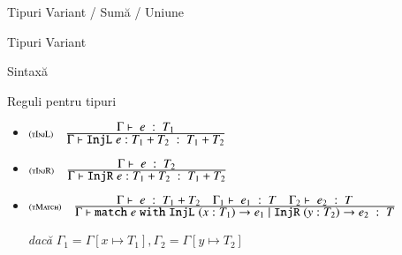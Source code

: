 \documentclass[xcolor=pdftex,romanian,colorlinks]{beamer}
\begin{document}
\begin{section}{Tipuri Variant / Sumă / Uniune}
\begin{frame}{Tipuri Variant}
\begin{block}{Sintaxă}
\end{block}

\begin{block}{Reguli pentru tipuri}
{\small\begin{itemize}
\item[] $\reg[tInjL]{\tjud{\terminal{InjL} e : T_1 + T_2}{T_1 + T_2}}{\tjud{e}{T_1}{}}{}$
\item[] $\reg[tInjR]{\tjud{\terminal{InjR} e : T_1 + T_2}{T_1 + T_2}}{\tjud{e}{T_2}{}}{}$
\item[] 
$\reg[tMatch]{\tjud{\Smatch e \Swith {\SInjL (x:T_1) \rightarrow e_1} \mid {\SInjR (y:T_2) \rightarrow e_2}}{T}}{\tjud{e}{T_1 + T_2}{}\si \tjud[\Gamma_1]{e_1}{T}{}\si \tjud[\Gamma_2]{e_2}{T}{}}{}$

\hfill {\it dacă} $\Gamma_1 = \Gamma[x \mapsto T_1], \Gamma_2 = \Gamma[y \mapsto T_2]$ 

\end{itemize}
}
\end{block}
\end{frame}


\end{section}
\end{document}
